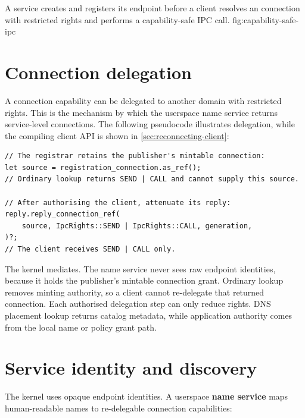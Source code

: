     {A service creates and registers its endpoint before a client resolves an
    connection with restricted rights and performs a capability-safe IPC call.}
    {fig:capability-safe-ipc}

\section{Connection delegation}

A connection capability can be delegated to another domain with restricted rights.
This is the mechanism by which the userspace name service returns service-level
connections. The following pseudocode illustrates delegation, while the compiling
client API is shown in \autoref{sec:reconnecting-client}:


\begin{lstlisting}[style=rustCode]
// The registrar retains the publisher's mintable connection:
let source = registration_connection.as_ref();
// Ordinary lookup returns SEND | CALL and cannot supply this source.

// After authorising the client, attenuate its reply:
reply.reply_connection_ref(
    source, IpcRights::SEND | IpcRights::CALL, generation,
)?;
// The client receives SEND | CALL only.
\end{lstlisting}

The kernel mediates. The name service never sees raw endpoint identities, because it
holds the publisher's mintable connection grant. Ordinary lookup removes
minting authority, so a client cannot re-delegate that returned connection.
Each authorised delegation step can only reduce rights. DNS placement lookup
returns catalog metadata, while application authority comes from the local name or
policy grant path.

\section{Service identity and discovery}

The kernel uses opaque endpoint identities. A userspace \textbf{name service}
maps human-readable names to re-delegable connection capabilities:

